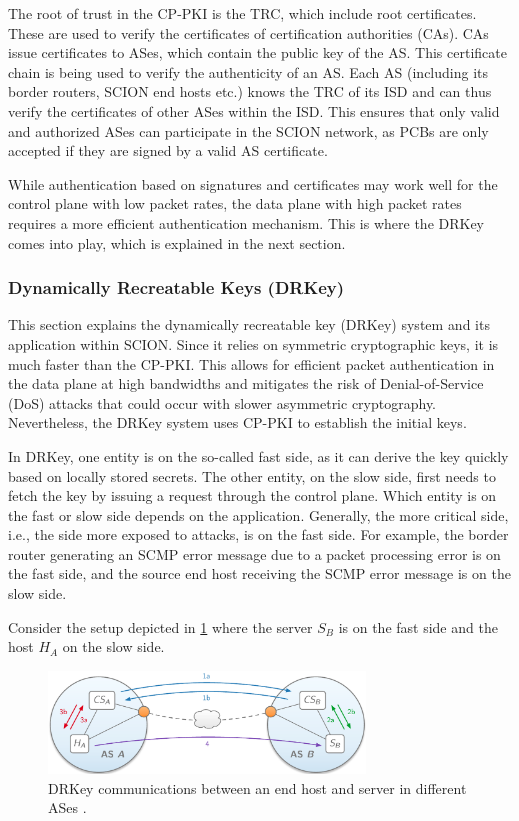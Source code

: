 The root of trust in the CP-PKI is the TRC, which include root certificates.
These are used to verify the certificates of certification authorities (CAs).
CAs issue certificates to ASes, which contain the public key of the AS.
This certificate chain is being used to verify the authenticity of an AS.
Each AS (including its border routers, SCION end hosts etc.) knows the TRC of its ISD and can thus verify the certificates of other ASes within the ISD.
This ensures that only valid and authorized ASes can participate in the SCION network, as PCBs are only accepted if they are signed by a valid AS certificate.

While authentication based on signatures and certificates may work well for the control plane with low packet rates, the data plane with high packet rates requires a more efficient authentication mechanism.
This is where the DRKey comes into play, which is explained in the next section.

\subsubsection{Dynamically Recreatable Keys (DRKey)}
\label{sec:drkey}
This section explains the dynamically recreatable key (DRKey) system \cite[Section 3.2]{Perrig2022} and its application within SCION.
Since it relies on symmetric cryptographic keys, it is much faster than the CP-PKI.
This allows for efficient packet authentication in the data plane at high bandwidths and mitigates the risk of Denial-of-Service (DoS) attacks that could occur with slower asymmetric cryptography.
Nevertheless, the DRKey system uses CP-PKI to establish the initial keys.

In DRKey, one entity is on the so-called fast side, as it can derive the key quickly based on locally stored secrets.
The other entity, on the slow side, first needs to fetch the key by issuing a request through the control plane.
Which entity is on the fast or slow side depends on the application.
Generally, the more critical side, i.e., the side more exposed to attacks, is on the fast side.
For example, the border router generating an SCMP error message due to a packet processing error is on the fast side, and the source end host receiving the SCMP error message is on the slow side.

Consider the setup depicted in \cref{fig:drkey_setup} where the server $S_B$ is on the fast side and the host $H_A$ on the slow side.
\begin{figure}[h]
    \centering
    \includegraphics[width=0.75\textwidth]{figures/drkey_topo.png}
    \caption{DRKey communications between an end host and server in different ASes \cite[Section 3.2.2]{Perrig2022}.}
    \label{fig:drkey_setup}
\end{figure}

